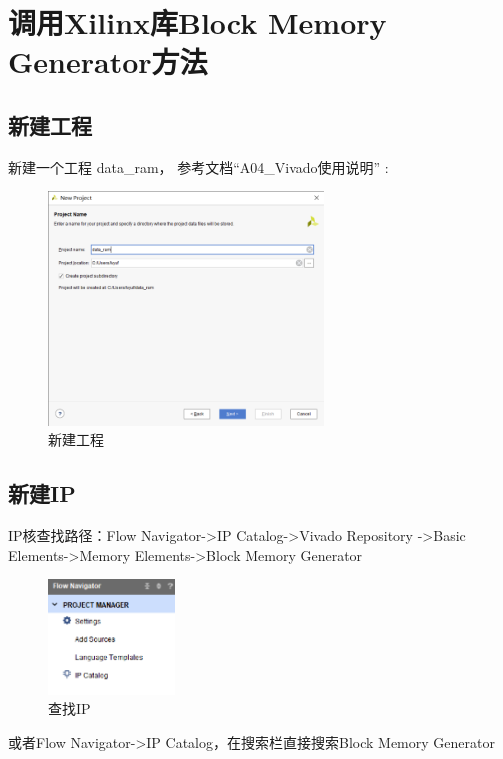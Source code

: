 \section{调用Xilinx库Block Memory Generator方法}\label{section:section_2}
\subsection{新建工程}
新建一个工程 data\_ram， 参考文档“A04\_Vivado使用说明” :
\begin{figure}[htbp]
    \centering
    \includegraphics[width = 0.65\textwidth]{image/2_section/section_2_0.png}
    \caption{新建工程}
    \label{fig:section_2_0}
\end{figure}
\subsection{新建IP}
IP核查找路径：Flow Navigator->IP Catalog->Vivado Repository ->Basic Elements->Memory Elements->Block Memory Generator
\begin{figure}[htbp]
    \centering
    \includegraphics[width = 0.3\textwidth]{image/2_section/section_2_1.png}
    \caption{查找IP}
    \label{fig:section_2_1}
\end{figure}

或者Flow Navigator->IP Catalog，在搜索栏直接搜索Block Memory Generator

